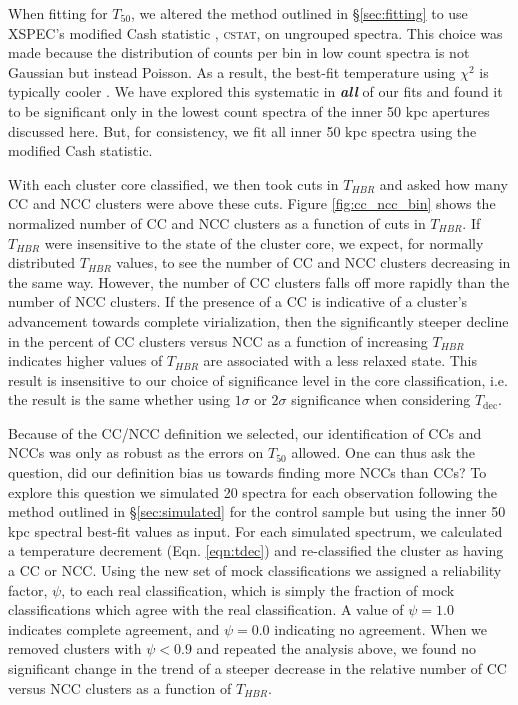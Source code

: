 \documentclass[apj]{emulateapj}
\begin{document}
When fitting for $T_{50}$, we altered the method outlined
in \S\ref{sec:fitting} to use {\textsc{XSPEC}}'s modified Cash statistic
\citep{1979ApJ...228..939C}, {\textsc{cstat}}, on ungrouped
spectra. This choice was made because the distribution of counts per
bin in low count spectra is not Gaussian but instead
Poisson. As a result, the best-fit temperature using $\chi^2$ is
typically cooler \citep{1989ApJ...342.1207N, 2007A&A...462..429B}. We
have explored this systematic in {\bfseries\em{all}} of our fits and
found it to be significant only in the lowest count spectra of the
inner 50 kpc apertures discussed here. But, for consistency, we fit all
inner 50 kpc spectra using the modified Cash statistic.

With each cluster core classified, we then took cuts in $T_{HBR}$ 
and asked how many CC and NCC clusters were above these cuts. 
Figure \ref{fig:cc_ncc_bin} shows the normalized number of CC and NCC
clusters as a function of cuts in $T_{HBR}$. If $T_{HBR}$ were
insensitive to the state of the cluster core, we expect, for normally
distributed $T_{HBR}$ values, to see the number of CC and NCC clusters
decreasing in the same way. However, the number of CC clusters falls
off more rapidly than the number of NCC clusters. If the presence of a
CC is indicative of a cluster's advancement towards complete
virialization, then the significantly steeper decline in the percent
of CC clusters versus NCC as a function of increasing $T_{HBR}$
indicates higher values of $T_{HBR}$ are associated with a less
relaxed state. This result is insensitive to our choice of
significance level in the core classification, i.e. the result is the
same whether using $1\sigma$ or $2\sigma$ significance when
considering $T_{\mathrm{dec}}$.

Because of the CC/NCC definition we selected, our identification of
CCs and NCCs was only as robust as the errors on $T_{50}$ allowed. One can
thus ask the question, did our definition bias us towards
finding more NCCs than CCs? To explore this question we simulated 20
spectra for each observation following the method outlined in
\S\ref{sec:simulated} for the control sample but using the inner 50
kpc spectral best-fit values as input. For each simulated spectrum, we
calculated a temperature decrement (Eqn. \ref{eqn:tdec}) and
re-classified the cluster as having a CC or NCC. Using the new set of
mock classifications we assigned a reliability factor, $\psi$, to each
real classification, which is simply the fraction of mock
classifications which agree with the real classification. A value of
$\psi = 1.0$ indicates complete agreement, and $\psi = 0.0$ indicating no
agreement. When we removed clusters with $\psi < 0.9$ and repeated the
analysis above, we found no significant change in the trend of a
steeper decrease in the relative number of CC versus NCC clusters as a
function of $T_{HBR}$.
\end{document}

